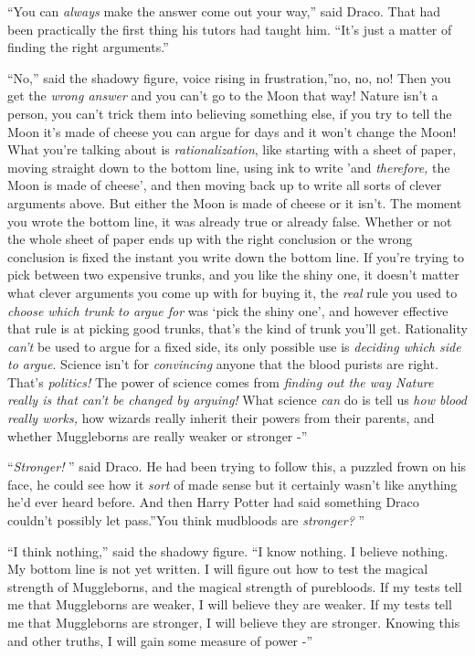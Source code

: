 ``You can \emph{always} make the answer come out your way,'' said Draco.
That had been practically the first thing his tutors had taught him.
``It's just a matter of finding the right arguments.''

``No,'' said the shadowy figure, voice rising in frustration,''no, no,
no! Then you get the \emph{wrong answer} and you can't go to the Moon
that way! Nature isn't a person, you can't trick them into believing
something else, if you try to tell the Moon it's made of cheese you can
argue for days and it won't change the Moon! What you're talking about
is \emph{rationalization}, like starting with a sheet of paper, moving
straight down to the bottom line, using ink to write 'and
\emph{therefore,} the Moon is made of cheese', and then moving back up
to write all sorts of clever arguments above. But either the Moon is
made of cheese or it isn't. The moment you wrote the bottom line, it was
already true or already false. Whether or not the whole sheet of paper
ends up with the right conclusion or the wrong conclusion is fixed the
instant you write down the bottom line. If you're trying to pick between
two expensive trunks, and you like the shiny one, it doesn't matter what
clever arguments you come up with for buying it, the \emph{real} rule
you used to \emph{choose which trunk to argue for} was `pick the shiny
one', and however effective that rule is at picking good trunks, that's
the kind of trunk you'll get. Rationality \emph{can't} be used to argue
for a fixed side, its only possible use is \emph{deciding which side to
argue}. Science isn't for \emph{convincing} anyone that the blood
purists are right. That's \emph{politics!} The power of science comes
from \emph{finding out the way Nature really is that can't be changed by
arguing!} What science \emph{can} do is tell us \emph{how blood really
works,} how wizards really inherit their powers from their parents, and
whether Muggleborns are really weaker or stronger -''

``\emph{Stronger!} '' said Draco. He had been trying to follow this, a
puzzled frown on his face, he could see how it \emph{sort} of made sense
but it certainly wasn't like anything he'd ever heard before. And then
Harry Potter had said something Draco couldn't possibly let pass.''You
think mudbloods are \emph{stronger?} ''

``I think nothing,'' said the shadowy figure. ``I know nothing. I
believe nothing. My bottom line is not yet written. I will figure out
how to test the magical strength of Muggleborns, and the magical
strength of purebloods. If my tests tell me that Muggleborns are weaker,
I will believe they are weaker. If my tests tell me that Muggleborns are
stronger, I will believe they are stronger. Knowing this and other
truths, I will gain some measure of power -''

